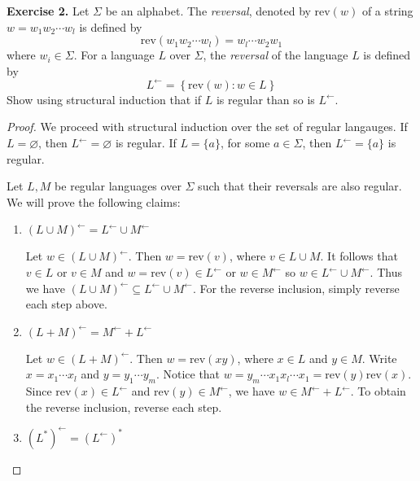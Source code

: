 \documentclass[11pt]{article}
\begin{document}
    \newpage
    \textbf{Exercise 2.} Let \(\Sigma\) be an alphabet. The \textit{reversal}, denoted by \(\mathrm{rev} (w)\) of a string \(w = w_1 w_2 \cdots w_l\) is defined by
    \[
        \mathrm{rev} (w_1 w_2 \cdots w_l) = w_l \cdots w_2 w_1
    \]
    where \(w_i \in \Sigma\). For a language \(L\) over \(\Sigma\), the \textit{reversal} of the language \(L\) is defined by
    \[
        L^{\leftarrow} = \left\{ \mathrm{rev} (w) : w \in L \right\}
    \]
    Show using structural induction that if \(L\) is regular than so is \(L^\leftarrow\).
    \begin{proof}
        We proceed with structural induction over the set of regular langauges. If \(L = \varnothing\), then \(L^\leftarrow = \varnothing\) is regular. If \(L = \{ a \}\), for some \(a \in \Sigma\), then \(L^\leftarrow = \{ a \}\) is regular.

        \medskip

        \noindent Let \(L,M\) be regular languages over \(\Sigma\) such that their reversals are also regular. We will prove the following claims:
        \begin{enumerate}[label=(\alph*)]
            \item \((L \cup M)^\leftarrow = L^\leftarrow \cup M^\leftarrow\)
            
            Let \(w \in (L \cup M)^\leftarrow\).
            Then \(w = \mathrm{rev} (v)\), where \(v \in L \cup M\). It follows that \(v \in L\) or \(v \in M\) and \(w = \mathrm{rev} (v) \in L^\leftarrow\) or \(w \in M^\leftarrow\) so \(w \in L^\leftarrow \cup M^\leftarrow\). Thus we have \((L \cup M)^\leftarrow \subseteq L^\leftarrow \cup M^\leftarrow\). For the reverse inclusion, simply reverse each step above.

            \item \((L + M)^\leftarrow = M^\leftarrow + L^\leftarrow\)
            
            Let \(w \in (L + M)^\leftarrow\). Then \(w = \mathrm{rev} (xy)\), where \(x \in L\) and \(y \in M\). Write \(x = x_1 \cdots x_l\) and \(y = y_1 \cdots y_m\). Notice that \(w = y_m \cdots x_1 x_l \cdots x_1 = \mathrm{rev} (y) \mathrm{rev} (x)\). Since \(\mathrm{rev} (x) \in L^\leftarrow\) and \(\mathrm{rev} (y) \in M^\leftarrow\), we have \(w \in M^\leftarrow + L^\leftarrow\). To obtain the reverse inclusion, reverse each step.

            \item \((L^*)^\leftarrow = (L^\leftarrow)^*\)
            

\end{enumerate}
\end{proof}
\end{document}
